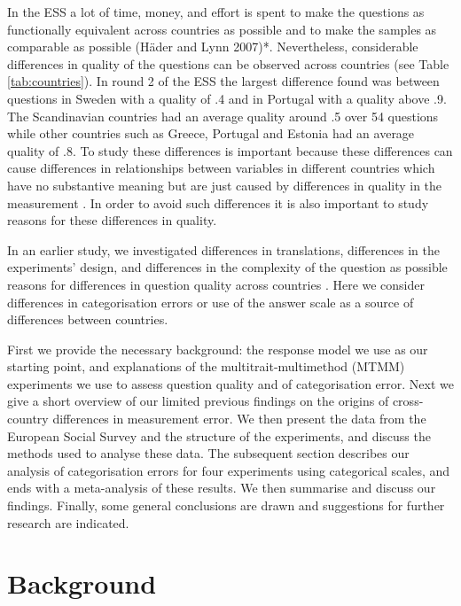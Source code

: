\documentclass[a4paper,12pt]{article}
\begin{document}
In the ESS a lot of time, money, and effort is spent to make the questions as functionally equivalent across countries as possible \cite{harkness_cross-cultural_2002} and to make the samples as comparable as possible (H\"{a}der and Lynn 2007)*. Nevertheless, considerable differences in quality of the questions can be observed across countries (see Table \ref{tab:countries}). In round 2 of the ESS the largest difference found was between questions in Sweden with a quality of .4 and in Portugal with a quality above .9. The Scandinavian countries had an average quality around .5 over 54 questions while other countries such as Greece, Portugal and Estonia had an average quality of .8.  To study these differences is important because these differences can cause differences in relationships between variables in different countries which have no substantive meaning but are just caused by differences in quality in the measurement \cite{Saris_design_2007}. In order to avoid such differences it is also important to study reasons for these differences in quality. 

In an earlier study, we investigated differences in translations, differences in the experiments' design, and differences in the complexity of the question as possible reasons for differences in question quality across countries \cite{oberski_differences_}. Here we consider differences in categorisation errors or use of the answer scale as a source of differences between countries. 

First we provide the necessary background: the response model we use as our starting point, and explanations of the multitrait-multimethod (MTMM) experiments we use to assess question quality  and of categorisation error. Next we give a short overview of our limited previous findings on the origins of cross-country differences in measurement error. We then present the data from the European Social Survey and the structure of the experiments, and discuss the methods used to analyse these data. The subsequent section describes our analysis of categorisation errors for four experiments using categorical scales, and ends with a meta-analysis of these results. We then summarise and discuss our findings. Finally, some general conclusions are drawn and suggestions for further research are indicated.

\section{Background}
\end{document}
